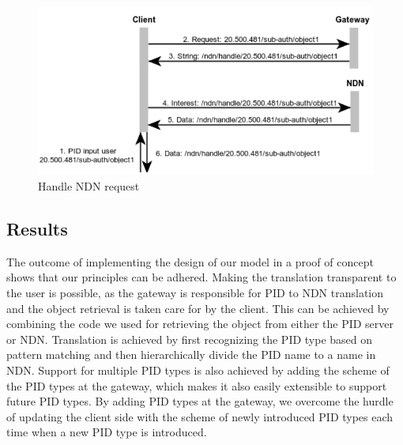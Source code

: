 \begin{figure}[H]
\includegraphics[scale=0.75]{Images/ndn_req.png}
\caption{Handle NDN request}
\label{fig:seq_ndn}
\end{figure}

\subsection{Results}
The outcome of implementing the design of our model in a proof of concept shows that our principles can be adhered.
Making the translation transparent to the user is possible, as the gateway is responsible for PID to NDN translation and the object retrieval is taken care for by the client. This can be achieved by combining the code we used for retrieving the object from either the PID server or NDN. Translation is achieved by first recognizing the PID type based on pattern matching and then hierarchically divide the PID name to a name in NDN. Support for multiple PID types is also achieved by adding the scheme of the PID types at the gateway, which makes it also easily extensible to support future PID types. By adding PID types at the gateway, we overcome the hurdle of updating the client side with the scheme of newly introduced PID types each time when a new PID type is introduced.